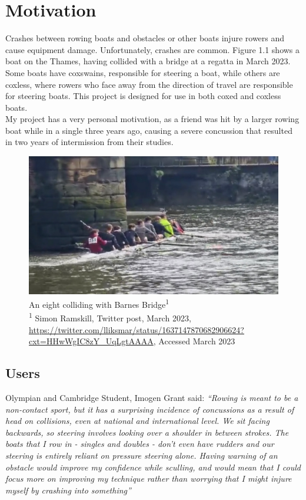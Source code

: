 \documentclass[12pt,a4paper]{report}
\begin{document}
\section{Motivation}	
Crashes between rowing boats and obstacles or other boats injure rowers and cause equipment damage. Unfortunately, crashes are common. Figure 1.1 shows a boat on the Thames, having collided with a bridge at a regatta in March 2023. Some boats have coxswains, responsible for steering a boat, while others are coxless, where rowers who face away from the direction of travel are responsible for steering boats. This project is designed for use in both coxed and coxless boats. \\
My project has a very personal motivation, as a friend was hit by a larger rowing boat while in a single three years ago, causing a severe concussion that resulted in two years of intermission from their studies. \\
\begin{figure}[h]
\begin{center}
\includegraphics[scale=0.5]{boatCrash.jpg.png}
\end{center}
\caption{An eight colliding with Barnes Bridge\textsuperscript{1} \\ \footnotesize\textsuperscript{1} Simon Ramskill, Twitter post, March 2023, \url{https://twitter.com/lliksmar/status/1637147870682906624?cxt=HHwWgIC8zY_UqLgtAAAA}, Accessed March 2023}
\end{figure}

\subsection{Users}
Olympian and Cambridge Student, Imogen Grant said:
\emph{``Rowing is meant to be a non-contact sport, but it has a surprising incidence of concussions as a result of head on collisions, even at national and international level. We sit facing backwards, so steering involves looking over a shoulder in between strokes. The boats that I row in - singles and doubles - don't even have rudders and our steering is entirely reliant on pressure steering alone. Having warning of an obstacle would improve my confidence while sculling, and would mean that I could focus more on improving my technique rather than worrying that I might injure myself by crashing into something''}
\end{document}
